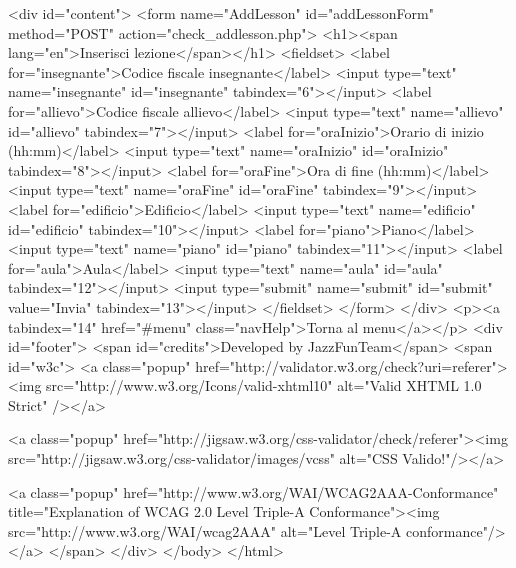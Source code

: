 \documentclass{article}
\begin{document}
\begin{php}
                <div id="content">
                        <form name="AddLesson" id="addLessonForm" method="POST" action="check_addlesson.php">
                                <h1><span lang="en">Inserisci lezione</span></h1>
                                <fieldset>
                                        <label for="insegnante">Codice fiscale insegnante</label>
                                          <input type="text" name="insegnante" id="insegnante" tabindex="6"></input>
					<label for="allievo">Codice fiscale allievo</label>
                                          <input type="text" name="allievo" id="allievo" tabindex="7"></input>
                                        <label for="oraInizio">Orario di inizio (hh:mm)</label>
					  <input type="text" name="oraInizio" id="oraInizio" tabindex="8"></input>
					<label for="oraFine">Ora di fine (hh:mm)</label>
                                          <input type="text" name="oraFine" id="oraFine" tabindex="9"></input>
					<label for="edificio">Edificio</label>
					  <input type="text" name="edificio" id="edificio" tabindex="10"></input>
					<label for="piano">Piano</label>
					  <input type="text" name="piano" id="piano" tabindex="11"></input>
					<label for="aula">Aula</label>
					  <input type="text" name="aula" id="aula" tabindex="12"></input>
					<input type="submit" name="submit" id="submit" value="Invia" tabindex="13"></input>
                                </fieldset>
                        </form>
                </div>
                <p><a tabindex="14" href="#menu" class="navHelp">Torna al menu</a></p>
                <div id="footer">
                        <span id="credits">Developed by JazzFunTeam</span>
                        <span id="w3c">
                                <a class="popup" href="http://validator.w3.org/check?uri=referer"><img src="http://www.w3.org/Icons/valid-xhtml10" alt="Valid XHTML 1.0 Strict" /></a>

                                <a class="popup" href="http://jigsaw.w3.org/css-validator/check/referer"><img src="http://jigsaw.w3.org/css-validator/images/vcss" alt="CSS Valido!"/></a>

                        <a class="popup" href="http://www.w3.org/WAI/WCAG2AAA-Conformance" title="Explanation of WCAG 2.0 Level Triple-A Conformance"><img src="http://www.w3.org/WAI/wcag2AAA" alt="Level Triple-A conformance"/></a>
                        </span>
                </div>
        </body>
</html>


\end{php}
\end{document}
